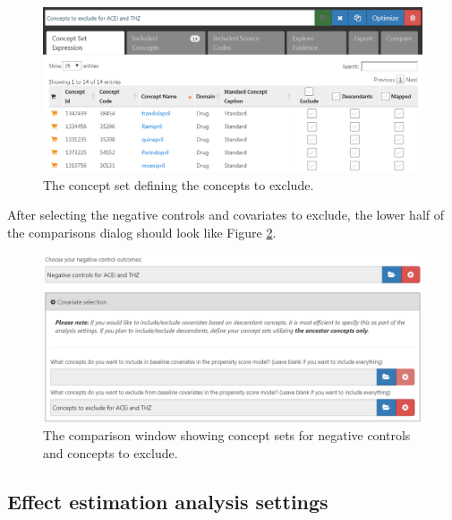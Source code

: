 \documentclass[]{book}
\begin{document}
\begin{figure}

{\centering \includegraphics[width=1\linewidth]{images/PopulationLevelEstimation/covsToExclude} 

}

\caption{The concept set defining the concepts to exclude.}\label{fig:covsToExclude}
\end{figure}

After selecting the negative controls and covariates to exclude, the lower half of the comparisons dialog should look like Figure \ref{fig:comparisons2}.

\begin{figure}

{\centering \includegraphics[width=1\linewidth]{images/PopulationLevelEstimation/comparisons2} 

}

\caption{The comparison window showing concept sets for negative controls and concepts to exclude.}\label{fig:comparisons2}
\end{figure}

\hypertarget{effect-estimation-analysis-settings}{%
\subsection{Effect estimation analysis settings}\label{effect-estimation-analysis-settings}}
\end{document}
